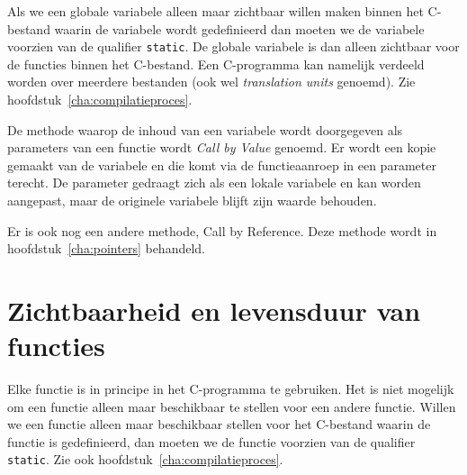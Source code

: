 Als we een globale variabele alleen maar zichtbaar willen maken binnen het C-bestand waarin de variabele wordt gedefinieerd dan moeten we de variabele voorzien van de qualifier \texttt{static}.
De globale variabele is dan alleen zichtbaar voor de functies binnen het C-bestand. Een C-programma kan namelijk verdeeld worden over meerdere bestanden (ook wel \textsl{translation units} genoemd). Zie hoofdstuk~\ref{cha:compilatieproces}.

\begin{infobox}
De methode waarop de inhoud van een variabele wordt doorgegeven als parameters van een functie wordt \textsl{Call by Value} genoemd. Er wordt een kopie gemaakt van de variabele en die komt via de functieaanroep in een parameter terecht. De parameter gedraagt zich als een lokale variabele en kan worden aangepast, maar de originele variabele blijft zijn waarde behouden.

Er is ook nog een andere methode, Call by Reference. Deze methode wordt in hoofdstuk~\ref{cha:pointers} behandeld.
\end{infobox}


\section{Zichtbaarheid en levensduur van functies}
Elke functie is in principe in het C-programma te gebruiken. Het is niet mogelijk om een functie alleen maar beschikbaar te stellen voor een andere functie. Willen we een functie alleen maar beschikbaar stellen voor het C-bestand waarin de functie is gedefinieerd, dan moeten we de functie voorzien van de qualifier \texttt{static}. Zie ook hoofdstuk~\ref{cha:compilatieproces}.



